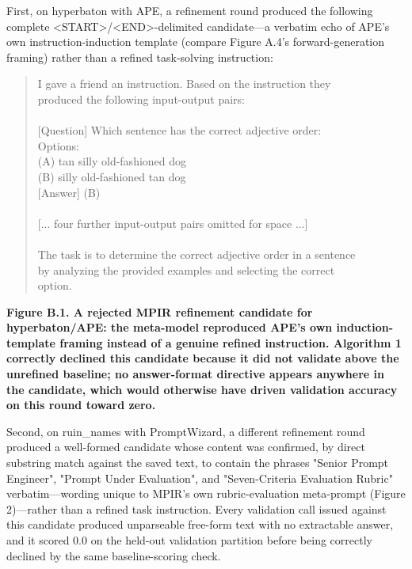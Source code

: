 \documentclass[a4paper,fleqn]{cas-sc}
\begin{document}
First, on hyperbaton with APE, a refinement round produced the following complete <START>/<END>-delimited candidate---a verbatim echo of APE's own instruction-induction template (compare Figure A.4's forward-generation framing) rather than a refined task-solving instruction:

\centering
\begin{quote}\ttfamily\small
I gave a friend an instruction. Based on the instruction they\\{}
produced the following input-output pairs:\\{}
~\\{}
[Question] Which sentence has the correct adjective order:\\{}
Options:\\{}
(A) tan silly old-fashioned dog\\{}
(B) silly old-fashioned tan dog\\{}
[Answer] (B)\\{}
~\\{}
[... four further input-output pairs omitted for space ...]\\{}
~\\{}
The task is to determine the correct adjective order in a sentence\\{}
by analyzing the provided examples and selecting the correct\\{}
option.\\{}
\end{quote}
\par\noindent\textbf{Figure B.1. A rejected MPIR refinement candidate for hyperbaton/APE: the meta-model reproduced APE's own induction-template framing instead of a genuine refined instruction. Algorithm 1 correctly declined this candidate because it did not validate above the unrefined baseline; no answer-format directive appears anywhere in the candidate, which would otherwise have driven validation accuracy on this round toward zero.}

Second, on ruin\_\allowbreak{}names with PromptWizard, a different refinement round produced a well-formed candidate whose content was confirmed, by direct substring match against the saved text, to contain the phrases "Senior Prompt Engineer", "Prompt Under Evaluation", and "Seven-Criteria Evaluation Rubric" verbatim---wording unique to MPIR's own rubric-evaluation meta-prompt (Figure 2)---rather than a refined task instruction. Every validation call issued against this candidate produced unparseable free-form text with no extractable answer, and it scored 0.0 on the held-out validation partition before being correctly declined by the same baseline-scoring check.
\end{document}
